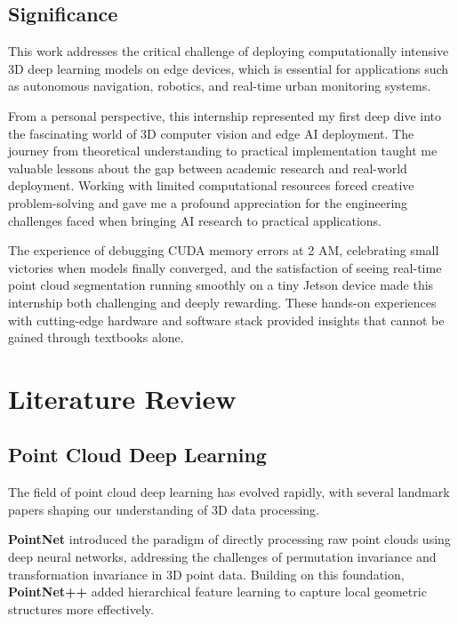 \documentclass[12pt,a4paper]{report}
\begin{document}
\section{Significance}

This work addresses the critical challenge of deploying computationally intensive 3D deep learning models on edge devices, which is essential for applications such as autonomous navigation, robotics, and real-time urban monitoring systems. 

From a personal perspective, this internship represented my first deep dive into the fascinating world of 3D computer vision and edge AI deployment. The journey from theoretical understanding to practical implementation taught me valuable lessons about the gap between academic research and real-world deployment. Working with limited computational resources forced creative problem-solving and gave me a profound appreciation for the engineering challenges faced when bringing AI research to practical applications.

The experience of debugging CUDA memory errors at 2 AM, celebrating small victories when models finally converged, and the satisfaction of seeing real-time point cloud segmentation running smoothly on a tiny Jetson device made this internship both challenging and deeply rewarding. These hands-on experiences with cutting-edge hardware and software stack provided insights that cannot be gained through textbooks alone.

\chapter{Literature Review}

\section{Point Cloud Deep Learning}

The field of point cloud deep learning has evolved rapidly, with several landmark papers shaping our understanding of 3D data processing.

\textbf{PointNet} \cite{qi2017pointnet} introduced the paradigm of directly processing raw point clouds using deep neural networks, addressing the challenges of permutation invariance and transformation invariance in 3D point data. Building on this foundation, \textbf{PointNet++} \cite{qi2017pointnetplus} added hierarchical feature learning to capture local geometric structures more effectively.
\end{document}

